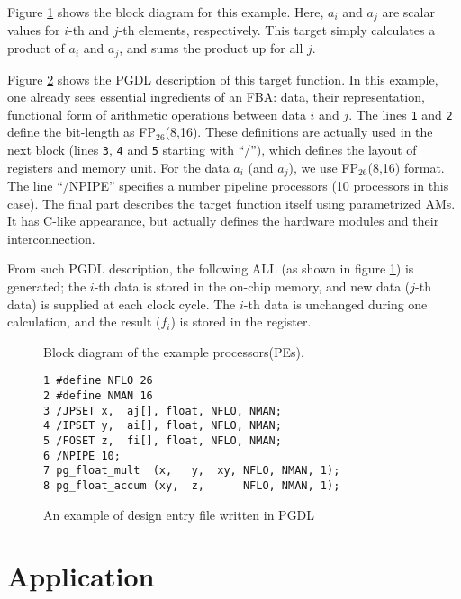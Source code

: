 \documentclass{article}
\begin{document}
Figure \ref{fig4} shows the block diagram for this example.
Here, $a_i$ and $a_j$ are scalar values for $i$-th and
$j$-th elements, respectively.
This target simply calculates a product of $a_i$ and $a_j$, 
and sums the product up for all $j$.

Figure \ref{fig5} shows the PGDL description of this target function.
In this example, one already sees essential ingredients of an FBA:
data, their representation, functional form of arithmetic operations
between data $i$ and $j$.
The lines \verb|1| and \verb|2| define the bit-length as FP$_{26}$(8,16).
These definitions are actually used in the next block
(lines \verb|3|, \verb|4| and \verb|5| starting with ``/''),
which defines the layout of registers and memory unit.
For the data $a_i$ (and $a_j$), we use FP$_{26}$(8,16) format.
The line ``/NPIPE'' specifies a number pipeline processors (10 processors in this case).
The final part describes the target function itself using
parametrized AMs. It has C-like appearance, but
actually defines the hardware modules and their interconnection.

From such PGDL description, the following ALL (as shown in figure \ref{fig4})
is generated; the $i$-th data is stored in the on-chip memory,
and new data ($j$-th data) is supplied at each clock cycle.
The $i$-th data is unchanged during one calculation, and 
the result ($f_i$) is stored in the register.


\begin{figure}[t]
\begin{minipage}[b]{1.0\linewidth}\centering
  \centerline{}
\end{minipage}
\caption{Block diagram of the example processors(PEs).}\label{fig4}
\end{figure}

\begin{figure}[t]
\scriptsize
\begin{verbatim}
1 #define NFLO 26
2 #define NMAN 16
3 /JPSET x,  aj[], float, NFLO, NMAN;
4 /IPSET y,  ai[], float, NFLO, NMAN;
5 /FOSET z,  fi[], float, NFLO, NMAN;
6 /NPIPE 10;
7 pg_float_mult  (x,   y,  xy, NFLO, NMAN, 1);
8 pg_float_accum (xy,  z,      NFLO, NMAN, 1);
\end{verbatim}
\caption{An example of design entry file written in PGDL}
\label{fig5}
\end{figure}

\section{Application}
\label{sec:Appli}
\end{document}

